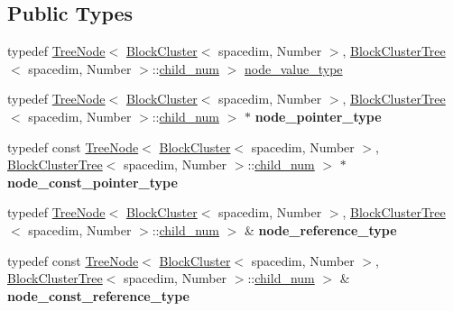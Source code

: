 \subsection*{Public Types}
\begin{DoxyCompactItemize}
\item 
typedef \hyperlink{classTreeNode}{Tree\+Node}$<$ \hyperlink{classBlockCluster}{Block\+Cluster}$<$ spacedim, Number $>$, \hyperlink{classBlockClusterTree}{Block\+Cluster\+Tree}$<$ spacedim, Number $>$\+::\hyperlink{classBlockClusterTree_a000c439b578bcf4fa28b7f3edd6079e9}{child\+\_\+num} $>$ \hyperlink{classBlockClusterTree_a960c20eac27464dedd804261f185c61f}{node\+\_\+value\+\_\+type}
\item 
\mbox{\label{classBlockClusterTree_a0fe6521e231371ee47687fc4ada1734a}} 
typedef \hyperlink{classTreeNode}{Tree\+Node}$<$ \hyperlink{classBlockCluster}{Block\+Cluster}$<$ spacedim, Number $>$, \hyperlink{classBlockClusterTree}{Block\+Cluster\+Tree}$<$ spacedim, Number $>$\+::\hyperlink{classBlockClusterTree_a000c439b578bcf4fa28b7f3edd6079e9}{child\+\_\+num} $>$ $\ast$ {\bfseries node\+\_\+pointer\+\_\+type}
\item 
\mbox{\label{classBlockClusterTree_ae009f8c6e64ac756770678366cf5e924}} 
typedef const \hyperlink{classTreeNode}{Tree\+Node}$<$ \hyperlink{classBlockCluster}{Block\+Cluster}$<$ spacedim, Number $>$, \hyperlink{classBlockClusterTree}{Block\+Cluster\+Tree}$<$ spacedim, Number $>$\+::\hyperlink{classBlockClusterTree_a000c439b578bcf4fa28b7f3edd6079e9}{child\+\_\+num} $>$ $\ast$ {\bfseries node\+\_\+const\+\_\+pointer\+\_\+type}
\item 
\mbox{\label{classBlockClusterTree_acff2ef08707f864bce5da02be6f9f8a9}} 
typedef \hyperlink{classTreeNode}{Tree\+Node}$<$ \hyperlink{classBlockCluster}{Block\+Cluster}$<$ spacedim, Number $>$, \hyperlink{classBlockClusterTree}{Block\+Cluster\+Tree}$<$ spacedim, Number $>$\+::\hyperlink{classBlockClusterTree_a000c439b578bcf4fa28b7f3edd6079e9}{child\+\_\+num} $>$ \& {\bfseries node\+\_\+reference\+\_\+type}
\item 
\mbox{\label{classBlockClusterTree_ac5dc9f60e63b4024045d1c0c41f92f5a}} 
typedef const \hyperlink{classTreeNode}{Tree\+Node}$<$ \hyperlink{classBlockCluster}{Block\+Cluster}$<$ spacedim, Number $>$, \hyperlink{classBlockClusterTree}{Block\+Cluster\+Tree}$<$ spacedim, Number $>$\+::\hyperlink{classBlockClusterTree_a000c439b578bcf4fa28b7f3edd6079e9}{child\+\_\+num} $>$ \& {\bfseries node\+\_\+const\+\_\+reference\+\_\+type}

\end{DoxyCompactItemize}
